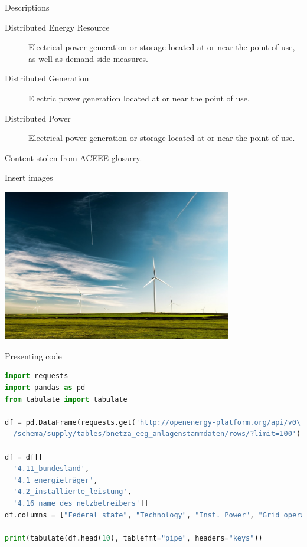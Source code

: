 \documentclass[ignorenonframetext,aspectratio=169]{beamer}
\begin{document}
\begin{frame}{Descriptions}

\blinddescription

\begin{description}
\item[Distributed Energy Resource]
Electrical power generation or storage located at or near the point of
use, as well as demand side measures.
\item[Distributed Generation]
Electric power generation located at or near the point of use.
\item[Distributed Power]
Electrical power generation or storage located at or near the point of
use.
\end{description}

\footnotesize Content stolen from
\href{https://aceee.org/glossary_data}{ACEEE glosarry}.

\end{frame}

\begin{frame}{Insert images}
\protect\hypertarget{insert-images}{}

\center

\includegraphics[width=0.75\textwidth,height=\textheight]{img/createria-ZYu6P9-Glic-unsplash_resized.jpg}

\end{frame}

\begin{frame}[fragile]{Presenting code}

\begin{lstlisting}[language=Python]
import requests
import pandas as pd
from tabulate import tabulate

df = pd.DataFrame(requests.get('http://openenergy-platform.org/api/v0\
  /schema/supply/tables/bnetza_eeg_anlagenstammdaten/rows/?limit=100').json())

df = df[[
  '4.11_bundesland',
  '4.1_energieträger', 
  '4.2_installierte_leistung',
  '4.16_name_des_netzbetreibers']]
df.columns = ["Federal state", "Technology", "Inst. Power", "Grid operator"]

print(tabulate(df.head(10), tablefmt="pipe", headers="keys"))
\end{lstlisting}

\end{frame}
\end{document}
